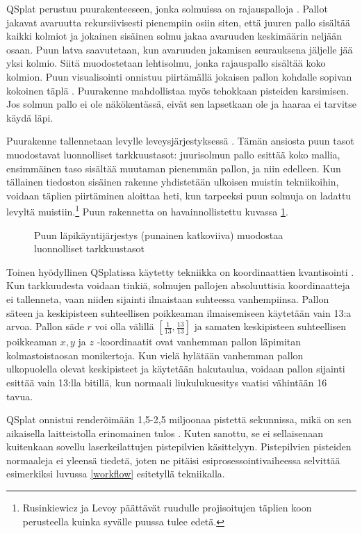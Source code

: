 QSplat perustuu puurakenteeseen, jonka solmuissa on rajauspalloja . Pallot jakavat avaruutta rekursiivisesti pienempiin osiin siten, että juuren pallo sisältää kaikki kolmiot ja jokainen sisäinen solmu jakaa avaruuden keskimäärin neljään osaan. Puun latva saavutetaan, kun avaruuden jakamisen seurauksena jäljelle jää yksi kolmio. Siitä muodostetaan lehtisolmu, jonka rajauspallo sisältää koko kolmion. Puun visualisointi onnistuu piirtämällä jokaisen pallon kohdalle sopivan kokoinen täplä . Puurakenne mahdollistaa myös tehokkaan pisteiden karsimisen. Jos solmun pallo ei ole näkökentässä, eivät sen lapsetkaan ole ja haaraa ei tarvitse käydä läpi. \cite{qsplat}

Puurakenne tallennetaan levylle leveysjärjestyksessä . Tämän ansiosta puun tasot muodostavat luonnolliset tarkkuustasot: juurisolmun pallo esittää koko mallia, ensimmäinen taso sisältää muutaman pienemmän pallon, ja niin edelleen. Kun tällainen tiedoston sisäinen rakenne yhdistetään ulkoisen muistin tekniikoihin, voidaan täplien piirtäminen aloittaa heti, kun tarpeeksi puun solmuja on ladattu levyltä muistiin.\footnote{Rusinkiewicz ja Levoy päättävät ruudulle projisoitujen täplien koon perusteella kuinka syvälle puussa tulee edetä.} Puun rakennetta on havainnollistettu kuvassa \ref{tarkkuustasot}. \cite{qsplat}

\begin{figure}
    \centering
    
    \caption{Puun läpikäyntijärjestys (punainen katkoviiva) muodostaa luonnolliset tarkkuustasot}
    \label{tarkkuustasot}
\end{figure}

Toinen hyödyllinen QSplatissa käytetty tekniikka on koordinaattien kvantisointi . Kun tarkkuudesta voidaan tinkiä, solmujen pallojen absoluuttisia koordinaatteja ei tallenneta, vaan niiden sijainti ilmaistaan suhteessa vanhempiinsa. Pallon säteen ja keskipisteen suhteellisen poikkeaman ilmaisemiseen käytetään vain 13:a arvoa. Pallon säde $r$ voi olla välillä $[\frac{1}{13}, \frac{13}{13}]$ ja samaten keskipisteen suhteellisen poikkeaman $x, y$ ja $z$ -koordinaatit ovat vanhemman pallon läpimitan kolmastoistaosan monikertoja. Kun vielä hylätään vanhemman pallon ulkopuolella olevat keskipisteet ja käytetään hakutaulua, voidaan pallon sijainti esittää vain 13:lla bitillä, kun normaali liukulukuesitys vaatisi vähintään 16 tavua. \cite{qsplat}

QSplat onnistui renderöimään 1,5-2,5 miljoonaa pistettä sekunnissa, mikä on sen aikaisella laitteistolla erinomainen tulos \cite{qsplat}. Kuten sanottu, se ei sellaisenaan kuitenkaan sovellu laserkeilattujen pistepilvien käsittelyyn. Pistepilvien pisteiden normaaleja ei yleensä tiedetä, joten ne pitäisi esiprosessointivaiheessa selvittää esimerkiksi luvussa \ref{workflow} esitetyllä tekniikalla. 

